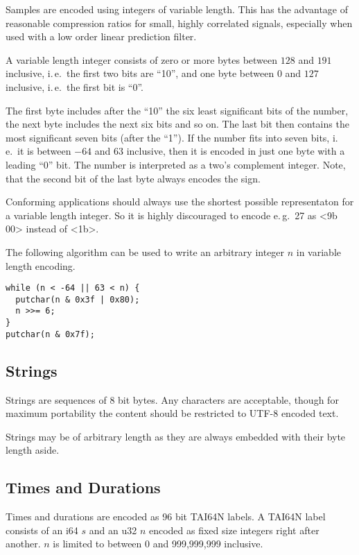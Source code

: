 \documentclass[DIV=10]{scrartcl}
\begin{document}
Samples are encoded using integers of variable length.
This has the advantage of reasonable compression ratios for small, highly correlated signals, especially when used with a low order linear prediction filter.

A variable length integer consists of zero or more bytes between \(128\) and \(191\) inclusive, i.\,e.\ the first two bits are “10”, and one byte between \(0\) and \(127\) inclusive, i.\,e.\ the first bit is “0”.

The first byte includes after the “10” the six least significant bits of the number, the next byte includes the next six bits and so on.
The last bit then contains the most significant seven bits (after the “1”).
If the number fits into seven bits, i.\,e.\ it is between \(-64\) and \(63\) inclusive, then it is encoded in just one byte with a leading “0” bit.
The number is interpreted as a two’s complement integer.
Note, that the second bit of the last byte always encodes the sign.

Conforming applications should always use the shortest possible representaton for a variable length integer.
So it is highly discouraged to encode e.\,g.\ 27 as <9b 00> instead of <1b>.

The following algorithm can be used to write an arbitrary integer \(n\) in variable length encoding.

\begin{verbatim}
while (n < -64 || 63 < n) {
  putchar(n & 0x3f | 0x80);
  n >>= 6;
}
putchar(n & 0x7f);
\end{verbatim}

\subsection{Strings}

Strings are sequences of 8 bit bytes.
Any characters are acceptable, though for maximum portability the content should be restricted to UTF-8 encoded text.

Strings may be of arbitrary length as they are always embedded with their byte length aside.

\subsection{Times and Durations}

Times and durations are encoded as 96 bit TAI64N labels.
A TAI64N label consists of an i64 \(s\) and an u32 \(n\) encoded as fixed size integers right after another.
\(n\) is limited to between 0 and 999,999,999 inclusive.
\end{document}
